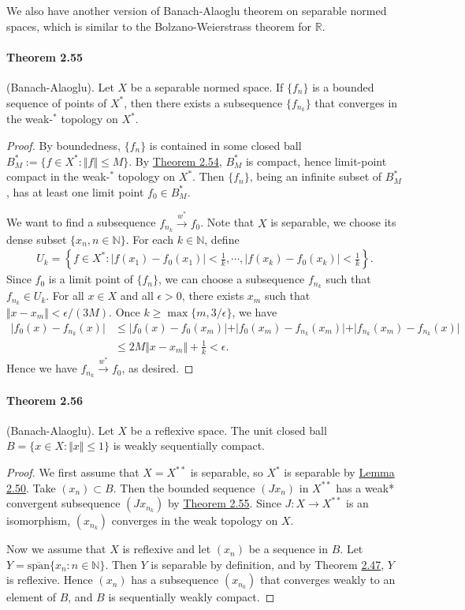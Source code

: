 \documentclass{article}
\begin{document}
We also have another version of Banach-Alaoglu theorem on separable normed spaces, which is similar to the Bolzano-Weierstrass theorem for $\mathbb{R}$.
\paragraph{Theorem 2.55\label{thm:2.55}} (Banach-Alaoglu). Let $X$ be a separable normed space. If $\{f_n\}$ is a bounded sequence of points of $X^*$, then there exists a subsequence $\{f_{n_k}\}$ that converges in the weak-$^*$ topology on $X^*$.
\begin{proof}
By boundedness, $\{f_n\}$ is contained in some closed ball $B_M^*:=\{f\in X^*:\Vert f\Vert\leq M\}$. By \hyperref[thm:2.54]{Theorem 2.54}, $B_M^*$ is compact, hence limit-point compact in the weak-$^*$ topology on $X^*$. Then $\{f_n\}$, being an infinite subset of $B_M^*$, has at least one limit point $f_0\in B_M^*$.

We want to find a subsequence $f_{n_k}\overset{w^*}{\to} f_0$. Note that $X$ is separable, we choose its dense subset $\{x_n,n\in\mathbb{N}\}$. For each $k\in\mathbb{N}$, define
\begin{align*}
	U_k = \left\{f\in X^*: \vert f(x_1) - f_0(x_1)\vert<\frac{1}{k},\cdots,\vert f(x_k) - f_0(x_k)\vert<\frac{1}{k}\right\}.
\end{align*}
Since $f_0$ is a limit point of $\{f_n\}$, we can choose a subsequence ${f_{n_k}}$ such that $f_{n_k}\in U_k$. For all $x\in X$ and all $\epsilon>0$, there exists $x_m$ such that $\Vert x-x_m\Vert < \epsilon/(3M)$. Once $k\geq\max\{m,3/\epsilon\}$, we have
\begin{align*}
	\vert f_0(x) - f_{n_k}(x)\vert &\leq \vert f_0(x) - f_0(x_m)\vert + \vert f_{0}(x_m) - f_{n_k}(x_m)\vert + \vert f_{n_k}(x_m) - f_{n_k}(x)\vert\\
	&\leq 2M\Vert x - x_m\Vert + \frac{1}{k} < \epsilon. 
\end{align*}
Hence we have $f_{n_k}\overset{w^*}{\to} f_0$, as desired.
\end{proof}

\paragraph{Theorem 2.56\label{thm:2.56}} (Banach-Alaoglu). Let $X$ be a reflexive space. The unit closed ball $B=\{x\in X:\Vert x\Vert\leq 1\}$ is weakly sequentially compact.
\begin{proof}
We first assume that $X=X^{**}$ is separable, so $X^*$ is separable by \hyperref[lemma:2.50]{Lemma 2.50}. Take $(x_n)\subset B$. Then the bounded sequence $(Jx_n)$ in $X^{**}$ has a weak* convergent subsequence $(Jx_{n_k})$ by \hyperref[thm:2.55]{Theorem 2.55}. Since $J:X\to X^{**}$ is an isomorphism, $(x_{n_k})$ converges in the weak topology on $X$.

Now we assume that $X$ is reflexive and let $(x_n)$ be a sequence in $B$. Let $Y=\overline{\mathrm{span}}\{x_n:n\in\mathbb{N}\}$. Then $Y$ is separable by definition, and by Theorem \hyperref[thm:2.47]{2.47}, $Y$ is reflexive. Hence $(x_n)$ has a subsequence $(x_{n_k})$ that converges weakly to an element of $B$, and $B$ is sequentially weakly compact.
\end{proof}
\end{document}

